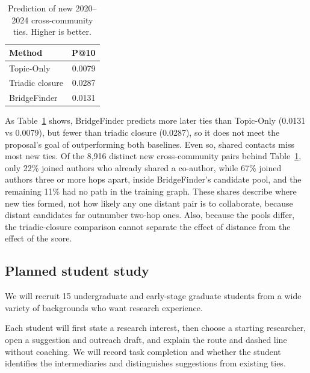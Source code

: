 \documentclass[10pt,twocolumn,letterpaper]{article}
\begin{document}
\begin{table}[!ht]
\centering\small
\setlength{\tabcolsep}{3pt}
\caption{Prediction of new 2020--2024 cross-community ties. Higher is better.}
\label{tab:results}
\renewcommand{\arraystretch}{1.1}
\begin{tabularx}{\columnwidth}{@{}Xr@{}}
\toprule
Method & P@10\\
\midrule
Topic-Only&0.0079\\
Triadic closure&0.0287\\
BridgeFinder&0.0131\\
\bottomrule
\end{tabularx}
\end{table}

As Table~\ref{tab:results} shows, BridgeFinder predicts more later ties than Topic-Only (0.0131 vs 0.0079), but fewer than triadic closure (0.0287), so it does not meet the proposal's goal of outperforming both baselines. Even so, shared contacts miss most new ties. Of the 8,916 distinct new cross-community pairs behind Table~\ref{tab:results}, only 22\% joined authors who already shared a co-author, while 67\% joined authors three or more hops apart, inside BridgeFinder's candidate pool, and the remaining 11\% had no path in the training graph. These shares describe where new ties formed, not how likely any one distant pair is to collaborate, because distant candidates far outnumber two-hop ones. Also, because the pools differ, the triadic-closure comparison cannot separate the effect of distance from the effect of the score.

\subsection{Planned student study}\label{sec:study}
We will recruit 15 undergraduate and early-stage graduate students from a wide variety of backgrounds who want research experience.

Each student will first state a research interest, then choose a starting researcher, open a suggestion and outreach draft, and explain the route and dashed line without coaching. We will record task completion and whether the student identifies the intermediaries and distinguishes suggestions from existing ties.
\end{document}
